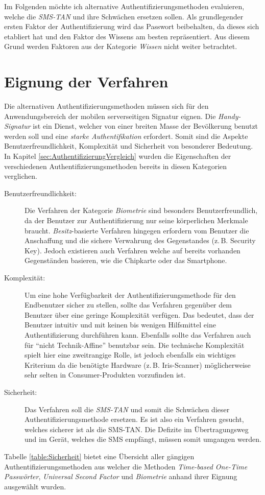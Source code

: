 \documentclass[11pt,a4paper,ngerman]{scrreprt}
\begin{document}
Im Folgenden möchte ich alternative Authentifizierungsmethoden evaluieren, welche die \textit{SMS-TAN} und ihre Schwächen ersetzen sollen. Als grundlegender ersten Faktor der Authentifizierung wird das Passwort beibehalten, da dieses sich etabliert hat und den Faktor des Wissens am besten repräsentiert. Aus diesem Grund werden Faktoren aus der Kategorie \emph{Wissen} nicht weiter betrachtet.

\section{Eignung der Verfahren}
Die alternativen Authentifizierungsmethoden müssen sich für den Anwendungsbereich der mobilen serverseitigen Signatur eignen. Die \textit{Handy-Signatur} ist ein Dienst, welcher von einer breiten Masse der Bevölkerung benutzt werden soll und eine \emph{starke Authentifikation} erfordert. Somit sind die Aspekte Benutzerfreundlichkeit, Komplexität und Sicherheit von besonderer Bedeutung. In Kapitel \ref{sec:AuthentifizierungVergleich} wurden die Eigenschaften der verschiedenen Authentifizierungsmethoden bereits in diesen Kategorien verglichen.
\begin{description}
    \item[Benutzerfreundlichkeit:] Die Verfahren der Kategorie \emph{Biometrie} sind besonders Benutzerfreundlich, da der Benutzer zur Authentifizierung nur seine körperlichen Merkmale braucht. \emph{Besitz}-basierte Verfahren hingegen erfordern vom Benutzer die Anschaffung und die sichere Verwahrung des Gegenstandes (z.\,B. Security Key). Jedoch existieren auch Verfahren welche auf bereits vorhanden Gegenständen basieren, wie die Chipkarte oder das Smartphone.
    \item[Komplexität:] Um eine hohe Verfügbarkeit der Authentifizierungsmethode für den Endbenutzer sicher zu stellen, sollte das Verfahren gegenüber dem Benutzer über eine geringe Komplexität verfügen. Das bedeutet, dass der Benutzer intuitiv und mit keinen bis wenigen Hilfsmittel eine Authentifizierung durchführen kann. Ebenfalls sollte das Verfahren auch für ``nicht Technik-Affine'' benutzbar sein. Die technische Komplexität spielt hier eine zweitrangige Rolle, ist jedoch ebenfalls ein wichtiges Kriterium da die benötigte Hardware (z.\,B. Iris-Scanner) möglicherweise sehr selten in Consumer-Produkten vorzufinden ist.
    \item[Sicherheit:] Das Verfahren soll die \textit{SMS-TAN} und somit die Schwächen dieser Authentifizierungsmethode ersetzen. Es ist also ein Verfahren gesucht, welches sicherer ist als die SMS-TAN. Die Defizite im Übertragungsweg und im Gerät, welches die SMS empfängt, müssen somit umgangen werden.
\end{description}
Tabelle \ref{table:Sicherheit} bietet eine Übersicht aller gängigen Authentifizierungsmethoden aus welcher die Methoden \textit{Time-based One-Time Passwörter}, \textit{Universal Second Factor} und \textit{Biometrie} anhand ihrer Eignung ausgewählt wurden.
\end{document}
